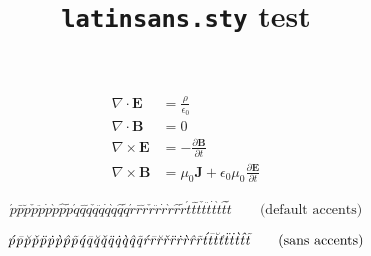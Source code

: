 \documentclass{article}
\title{\texttt{latinsans.sty} test}
\date{}
\begin{document}
  \maketitle

  \begin{align*}
    \nabla\cdot\mathbf{E} &= \frac{\rho}{\epsilon_0}\\
    \nabla\cdot\mathbf{B} &= 0\\
    \nabla\times\mathbf{E} &= -\frac{\partial\mathbf{B}}{\partial{t}}\\
    \nabla\times\mathbf{B} &= \mu_0\mathbf{J} + \epsilon_0\mu_0\frac{\partial\mathbf{E}}{\partial{t}}
  \end{align*}

  \begin{equation}
  \acute{p}
  \bar{p}
  \breve{p}
  \check{p}
  \ddot{p}
  \dot{p}
  \grave{p}
  \hat{p}
  \tilde{p}
  \acute{q}
  \bar{q}
  \breve{q}
  \check{q}
  \ddot{q}
  \dot{q}
  \grave{q}
  \hat{q}
  \tilde{q}
  \acute{r}
  \bar{r}
  \breve{r}
  \check{r}
  \ddot{r}
  \dot{r}
  \grave{r}
  \hat{r}
  \tilde{r}
  \acute{t}
  \bar{t}
  \breve{t}
  \check{t}
  \ddot{t}
  \dot{t}
  \grave{t}
  \hat{t}
  \tilde{t}
  \qquad{\text{(default accents)}}
  \end{equation}

  \begin{equation}
  \sacute{p}
  \sbar{p}
  \sbreve{p}
  \scheck{p}
  \sddot{p}
  \sdot{p}
  \sgrave{p}
  \shat{p}
  \stilde{p}
  \sacute{q}
  \sbar{q}
  \sbreve{q}
  \scheck{q}
  \sddot{q}
  \sdot{q}
  \sgrave{q}
  \shat{q}
  \stilde{q}
  \sacute{r}
  \sbar{r}
  \sbreve{r}
  \scheck{r}
  \sddot{r}
  \sdot{r}
  \sgrave{r}
  \shat{r}
  \stilde{r}
  \sacute{t}
  \sbar{t}
  \sbreve{t}
  \scheck{t}
  \sddot{t}
  \sdot{t}
  \sgrave{t}
  \shat{t}
  \stilde{t}
  \qquad{\text{(sans accents)}}
  \end{equation}
\end{document}
